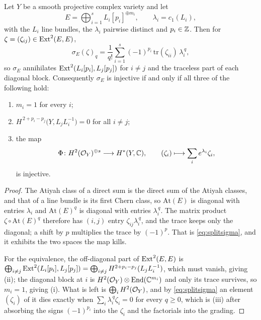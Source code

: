 \begin{lemma}\label{lem:splitsemireg}
Let $Y$ be a smooth projective complex variety and let
\[
  E=\bigoplus_{i=1}^{s}L_{i}[p_{i}]^{\oplus m_{i}},
  \qquad \lambda_{i}=c_{1}(L_{i}),
\]
with the $L_{i}$ line bundles, the $\lambda_{i}$ pairwise distinct and
$p_{i}\in\mathbb{Z}$. Then for $\zeta=(\zeta_{ij})\in\operatorname{Ext}^{2}(E,E)$,
\begin{equation}\label{eq:splitsigma}
  \sigma_{E}(\zeta)_{q}
  =\frac{1}{q!}\sum_{i=1}^{s}(-1)^{p_{i}}\,
    \mathrm{tr}(\zeta_{ii})\,\lambda_{i}^{\,q},
\end{equation}
so $\sigma_{E}$ annihilates $\operatorname{Ext}^{2}(L_{i}[p_{i}],L_{j}[p_{j}])$ for $i\ne j$
and the traceless part of each diagonal block. Consequently $\sigma_{E}$ is
injective if and only if all three of the following hold:
\begin{enumerate}[label=\textup{(\roman*)},nosep]
\item $m_{i}=1$ for every $i$;
\item $H^{\,2+p_{i}-p_{j}}\bigl(Y,L_{j}L_{i}^{-1}\bigr)=0$ for all $i\ne j$;
\item the map
  \[
    \Phi\colon H^{2}(\mathcal{O}_{Y})^{\oplus s}\longrightarrow H^{*}(Y,\mathbb{C}),
    \qquad
    (\zeta_{i})\longmapsto\sum_{i}e^{\lambda_{i}}\zeta_{i},
  \]
  is injective.
\end{enumerate}
\end{lemma}

\begin{proof}
The Atiyah class of a direct sum is the direct sum of the Atiyah classes, and
that of a line bundle is its first Chern class, so $\mathrm{At}(E)$ is
diagonal with entries $\lambda_{i}$ and $\mathrm{At}(E)^{q}$ is diagonal with
entries $\lambda_{i}^{\,q}$. The matrix product $\zeta\circ\mathrm{At}(E)^{q}$
therefore has $(i,j)$ entry $\zeta_{ij}\lambda_{i}^{\,q}$, and the trace keeps
only the diagonal; a shift by $p$ multiplies the trace by $(-1)^{p}$. That is
\eqref{eq:splitsigma}, and it exhibits the two spaces the map kills.

For the equivalence, the off-diagonal part of $\operatorname{Ext}^{2}(E,E)$ is
$\bigoplus_{i\ne j}\operatorname{Ext}^{2}(L_{i}[p_{i}],L_{j}[p_{j}])
=\bigoplus_{i\ne j}H^{2+p_{i}-p_{j}}(L_{j}L_{i}^{-1})$, which must vanish,
giving (ii); the diagonal block at $i$ is $H^{2}(\mathcal{O}_{Y})\otimes
\mathrm{End}(\mathbb{C}^{m_{i}})$ and only its trace survives, so $m_{i}=1$, giving
(i). What is left is $\bigoplus_{i}H^{2}(\mathcal{O}_{Y})$, and by
\eqref{eq:splitsigma} an element $(\zeta_{i})$ of it dies exactly when
$\sum_{i}\lambda_{i}^{\,q}\zeta_{i}=0$ for every $q\ge0$, which is (iii) after
absorbing the signs $(-1)^{p_{i}}$ into the $\zeta_{i}$ and the factorials
into the grading.
\end{proof}

